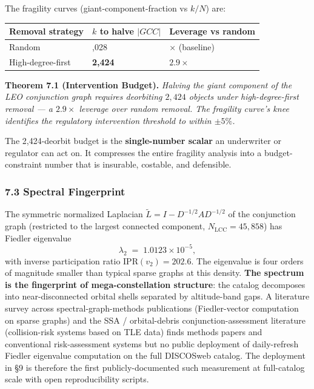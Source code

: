 \documentclass[
]{article}
\newcounter{none} %
\begin{document}
The fragility curves (giant-component-fraction vs \(k/N\)) are:

{\def\LTcaptype{none} %
\begin{longtable}[]{@{}
  >{\raggedright\arraybackslash}p{}
  >{\raggedright\arraybackslash}p{}
  >{\raggedright\arraybackslash}p{}@{}}
\toprule\noalign{}
\begin{minipage}[b]{\linewidth}\raggedright
Removal strategy
\end{minipage} & \begin{minipage}[b]{\linewidth}\raggedright
\(k\) to halve \(\lvert GCC \rvert\)
\end{minipage} & \begin{minipage}[b]{\linewidth}\raggedright
Leverage vs random
\end{minipage} \\
\midrule\noalign{}
\endhead
\bottomrule\noalign{}
\endlastfoot
Random & 7,028 & 1.0× (baseline) \\
High-degree-first & \textbf{2,424} & \(\mathbf{2.9\times}\) \\
\end{longtable}
}

\textbf{Theorem 7.1 (Intervention Budget).} \emph{Halving the giant
component of the LEO conjunction graph requires deorbiting \(2{,}424\)
objects under high-degree-first removal --- a \(2.9\times\) leverage
over random removal. The fragility curve's knee identifies the
regulatory intervention threshold to within \(\pm 5\%\).}

The 2,424-deorbit budget is the \textbf{single-number scalar} an
underwriter or regulator can act on. It compresses the entire fragility
analysis into a budget-constraint number that is insurable, costable,
and defensible.

\subsubsection{7.3 Spectral Fingerprint}\label{spectral-fingerprint}

The symmetric normalized Laplacian
\(\tilde L = I - D^{-1/2} A D^{-1/2}\) of the conjunction graph
(restricted to the largest connected component,
\(N_\text{LCC} = 45{,}858\)) has Fiedler eigenvalue
\[\lambda_2 \;=\; 1.0123 \times 10^{-5}, \tag{7.1}\] with inverse
participation ratio \(\text{IPR}(v_2) = 202.6\). The eigenvalue is four
orders of magnitude smaller than typical sparse graphs at this density.
\textbf{The spectrum is the fingerprint of mega-constellation
structure}: the catalog decomposes into near-disconnected orbital shells
separated by altitude-band gaps. A literature survey across
spectral-graph-methods publications (Fiedler-vector computation on
sparse graphs) and the SSA / orbital-debris conjunction-assessment
literature (collision-risk systems based on TLE data) finds methods
papers and conventional risk-assessment systems but no public deployment
of daily-refresh Fiedler eigenvalue computation on the full DISCOSweb
catalog. The deployment in §9 is therefore the first publicly-documented
such measurement at full-catalog scale with open reproducibility
scripts.
\end{document}
